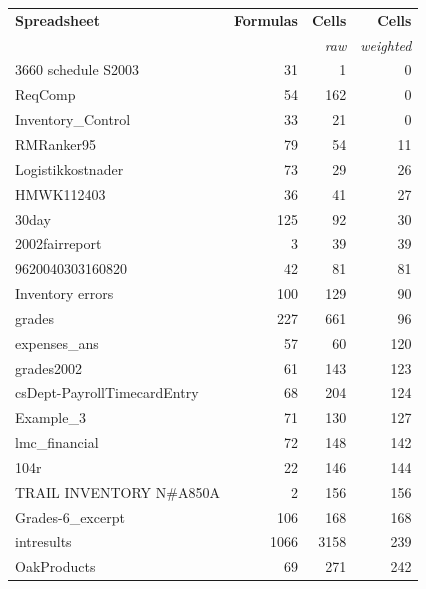 \begin{table}[t!]
  \centering
    \begin{tabular}{l|rrr}
      \bf{Spreadsheet} & \textsf{\bf{Formulas}}  & {\bf{Cells}}       & {\bf{Cells}} \\
                       &                         & {\small{\it{raw}}} & {\small{\it{weighted}}} \\
    \hline
\small{3660 schedule S2003} & \small{31} & \small{1} & \small{0} \\ 
\small{ReqComp} & \small{54} & \small{162} & \small{0} \\ 
\small{Inventory\_Control} & \small{33} & \small{21} & \small{0} \\ 
\small{RMRanker95} & \small{79} & \small{54} & \small{11} \\ 
\small{Logistikkostnader} & \small{73} & \small{29} & \small{26} \\ 
\small{HMWK112403} & \small{36} & \small{41} & \small{27} \\ 
\small{30day} & \small{125} & \small{92} & \small{30} \\ 
\small{2002fairreport} & \small{3} & \small{39} & \small{39} \\ 
\small{9620040303160820} & \small{42} & \small{81} & \small{81} \\ 
\small{Inventory errors} & \small{100} & \small{129} & \small{90} \\ 
\small{grades} & \small{227} & \small{661} & \small{96} \\ 
\small{expenses\_ans} & \small{57} & \small{60} & \small{120} \\ 
\small{grades2002} & \small{61} & \small{143} & \small{123} \\ 
\small{csDept-PayrollTimecardEntry} & \small{68} & \small{204} & \small{124} \\ 
\small{Example\_3} & \small{71} & \small{130} & \small{127} \\ 
\small{lmc\_financial} & \small{72} & \small{148} & \small{142} \\ 
\small{104r} & \small{22} & \small{146} & \small{144} \\ 
\small{TRAIL INVENTORY N\#A850A} & \small{2} & \small{156} & \small{156} \\ 
\small{Grades-6\_excerpt} & \small{106} & \small{168} & \small{168} \\ 
\small{intresults} & \small{1066} & \small{3158} & \small{239} \\ 
\small{OakProducts} & \small{69} & \small{271} & \small{242} \\ 

\end{tabular}
\end{table}
